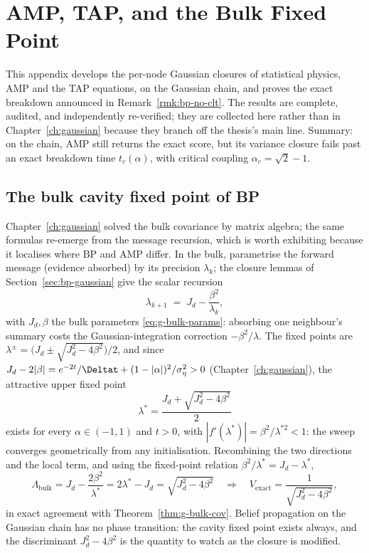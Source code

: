 \chapter{AMP, TAP, and the Bulk Fixed Point}\label{app:amp}

This appendix develops the per-node Gaussian closures of statistical
physics, AMP and the TAP equations, on the Gaussian chain, and proves the
exact breakdown announced in Remark~\ref{rmk:bp-no-clt}. The results are
complete, audited, and independently re-verified; they are collected here
rather than in Chapter~\ref{ch:gaussian} because they branch off the
thesis's main line. Summary: on the chain, AMP still returns the exact
score, but its variance closure fails past an exact breakdown time
$t_c(\alpha)$, with critical coupling $\alpha_c = \sqrt{2} - 1$.

\section{The bulk cavity fixed point of BP}\label{sec:amp-bulk-bp}

Chapter~\ref{ch:gaussian} solved the bulk covariance by matrix algebra;
the same formulas re-emerge from the message recursion, which is worth
exhibiting because it localises where BP and AMP differ. In the bulk,
parametrise the forward message (evidence absorbed) by its precision
$\lambda_k$; the closure lemmas of Section~\ref{sec:bp-gaussian} give the
scalar recursion
\begin{equation}
  \lambda_{k+1} \;=\; J_d - \frac{\beta^2}{\lambda_k},
  \label{eq:bp-cavity}
\end{equation}
with $J_d, \beta$ the bulk parameters \eqref{eq:g-bulk-params}: absorbing
one neighbour's summary costs the Gaussian-integration correction
$-\beta^2/\lambda$. The fixed points are
$\lambda^\pm = \big( J_d \pm \sqrt{J_d^2 - 4\beta^2} \big)/2$, and since
$J_d - 2|\beta| = e^{-2t}/\Deltat + (1 - |\alpha|)^2/\sigma_\eta^2 > 0$
(Chapter~\ref{ch:gaussian}), the attractive upper fixed point
\begin{equation}
  \boxed{\;\lambda^\ast = \frac{J_d + \sqrt{J_d^2 - 4\beta^2}}{2}\;}
  \label{eq:bp-lambdastar}
\end{equation}
exists for every $\alpha \in (-1,1)$ and $t > 0$, with
$|f'(\lambda^\ast)| = \beta^2/\lambda^{\ast 2} < 1$: the sweep converges
geometrically from any initialisation. Recombining the two directions and
the local term, and using the fixed-point relation
$\beta^2/\lambda^\ast = J_d - \lambda^\ast$,
\begin{equation}
  \Lambda_{\mathrm{bulk}}
  = J_d - \frac{2\beta^2}{\lambda^\ast}
  = 2\lambda^\ast - J_d
  = \sqrt{J_d^2 - 4\beta^2}
  \quad\Longrightarrow\quad
  V_{\mathrm{exact}} = \frac{1}{\sqrt{J_d^2 - 4\beta^2}} ,
  \label{eq:bp-bulkvar}
\end{equation}
in exact agreement with Theorem~\ref{thm:g-bulk-cov}. Belief propagation
on the Gaussian chain has no phase transition: the cavity fixed point
exists always, and the discriminant $J_d^2 - 4\beta^2$ is the quantity to
watch as the closure is modified.


